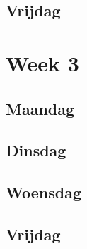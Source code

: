 \documentclass[12pt]{article}
\begin{document}
\subsection*{Vrijdag}

\section*{Week 3}
\subsection*{Maandag}
\subsection*{Dinsdag}
\subsection*{Woensdag}
\subsection*{Vrijdag}
\end{document}
